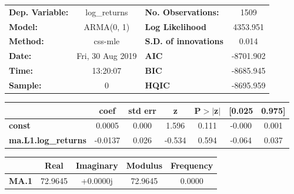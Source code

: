 \begin{center}
\begin{tabular}{lclc}
\toprule
\textbf{Dep. Variable:}     &        log\_returns       & \textbf{  No. Observations:  } &            1509            \\
\textbf{Model:}             &         ARMA(0, 1)        & \textbf{  Log Likelihood     } &          4353.951          \\
\textbf{Method:}            &          css-mle          & \textbf{  S.D. of innovations} &           0.014            \\
\textbf{Date:}              &      Fri, 30 Aug 2019     & \textbf{  AIC                } &         -8701.902          \\
\textbf{Time:}              &          13:20:07         & \textbf{  BIC                } &         -8685.945          \\
\textbf{Sample:}            &             0             & \textbf{  HQIC               } &         -8695.959          \\
\bottomrule
\end{tabular}
\begin{tabular}{lcccccc}
                            & \textbf{coef} & \textbf{std err} & \textbf{z} & \textbf{P$> |$z$|$} & \textbf{[0.025} & \textbf{0.975]}  \\
\midrule
\textbf{const}              &       0.0005  &        0.000     &     1.596  &         0.111        &       -0.000    &        0.001     \\
\textbf{ma.L1.log\_returns} &      -0.0137  &        0.026     &    -0.534  &         0.594        &       -0.064    &        0.037     \\
\bottomrule
\end{tabular}
\begin{tabular}{lcccc}
              & \textbf{            Real} & \textbf{         Imaginary} & \textbf{         Modulus} & \textbf{        Frequency}  \\
\midrule
\textbf{MA.1} &               72.9645     &                +0.0000j     &               72.9645     &                0.0000       \\
\bottomrule
\end{tabular}
\end{center}
